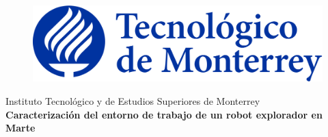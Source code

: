 \documentclass{article}
\begin{document}
    \begin{titlepage}
        \begin{center}
            \begin{figure}
                \centering
                \includegraphics[scale=0.13]{logo_itesm.png}\\ %
            \end{figure}
        \vspace{5cm}
        \LARGE{Instituto Tecnológico y de Estudios Superiores de Monterrey}\\
        \fontsize{12}{14}\selectfont
        \vspace{1cm}
        \textbf{Caracterización del entorno de trabajo de un robot explorador en Marte}\\ %
        \vspace{0.7cm}

\end{center}
\end{titlepage}
\end{document}
